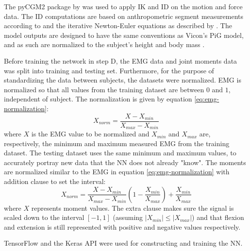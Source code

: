 \documentclass[../main.tex]{subfiles}
\begin{document}
The pyCGM2 package by \textcite{Leboeuf2019} was used to apply \ac{IK} and \ac{ID} on the motion and force data.
The \ac{ID} computations are based on anthropometric segment measurements according to \textcite{Dempster1955} and the iterative Newton-Euler equations as described by \textcite{Dumas2004}.
The model outputs are designed to have the same conventions as Vicon's \ac{PiG} model, and as such are normalized to the subject's height and body mass \cite{Leboeuf2019, viconpig}.

Before training the network in step D, the \ac{EMG} data and joint moments data was split into training and testing set.
Furthermore, for the purpose of standardizing the data between subjects, the datasets were normalized.
\ac{EMG} is normalized so that all values from the training dataset are between $0$ and $1$, independent of subject.
The normalization is given by equation \ref{eq:emg-normalization}:
\begin{equation}
\label{eq:emg-normalization}
    X_{norm} = \frac{X - X_{min}}{X_{max} - X_{min}}
\end{equation}
where $X$ is the \ac{EMG} value to be normalized and $X_{min}$ and $X_{max}$ are, respectively, the minimum and maximum measured \ac{EMG} from the training dataset. 
The testing dataset uses the same minimum and maximum values, to accurately portray new data that the \ac{NN} does not already "know".
The moments are normalized similar to the \ac{EMG} in equation \ref{eq:emg-normalization} with addition clause to set the interval:
\begin{equation}
\label{eq:moment-normalization}
    X_{norm} = \frac{X - X_{min}}{X_{max} - X_{min}}\left(1 - \frac{X_{min}}{X_{max}}\right) + \frac{X_{min}}{X_{max}}
\end{equation}
where $X$ represents moment values. 
The extra clause makes sure the signal is scaled down to the interval $[-1,1]$ (assuming $\left|X_{min}\right| \leq \left|X_{max}\right|$) and that flexion and extension is still represented with positive and negative values respectively.

TensorFlow \cite{tensorflow2015-whitepaper} and the Keras API \cite{chollet2015keras} were used for constructing and training the \ac{NN}.

\end{document}
